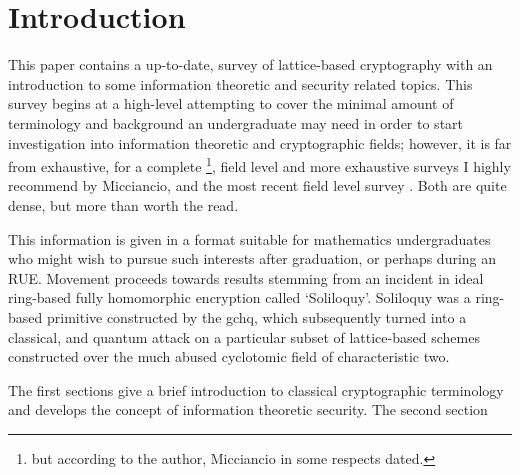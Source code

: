 \section{Introduction}



This paper contains a up-to-date, survey of lattice-based cryptography with an introduction to some information theoretic and security related topics. This survey begins at a high-level attempting to cover the minimal amount of terminology and background an undergraduate may need in order to start investigation into information theoretic and cryptographic fields; however, it is far from exhaustive, for a complete \footnote{but according to the author, Micciancio in some respects dated.}, field level and more exhaustive surveys I highly recommend \cite{Mic2002} by Micciancio, and the most recent field level survey \cite{Pei2015}. Both are quite dense, but more than worth the read.

This information is given in a format suitable for mathematics undergraduates who might wish to pursue such interests after graduation, or perhaps during an RUE. Movement proceeds towards results stemming from an incident in ideal ring-based fully homomorphic encryption called `Soliloquy'. Soliloquy was a ring-based primitive constructed by the \acrfull{gchq}, which subsequently turned into a classical, and quantum attack on a particular subset of lattice-based schemes constructed over the much abused cyclotomic field of characteristic two. 

 
The first sections give a brief introduction to classical cryptographic terminology and develops the concept of information theoretic security. The second section

